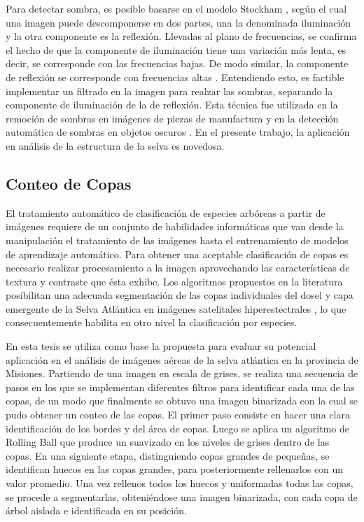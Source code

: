 Para detectar sombra, es posible basarse en el modelo Stockham \cite{stockham_image_1972}, según el cual una imagen puede descomponerse en dos partes, una la denominada iluminación y la otra componente es la reflexión. Llevadas al plano de frecuencias, se confirma el hecho de que la componente de iluminación tiene una variación más lenta, es decir, se corresponde con las frecuencias bajas. De modo similar, la componente de reflexión se corresponde con frecuencias altas \cite{oppenheim_nonlinear_1968}. Entendiendo esto, es factible implementar un filtrado en la imagen para realzar las sombras, separando la componente de iluminación de la de reflexión. Esta técnica fue utilizada en la remoción de sombras en imágenes de piezas de manufactura \cite{yang_research_2012} y en la detección automática de sombras en objetos oscuros \cite{etemadnia_automatic_2003}. En el presente trabajo, la aplicación en análisis de la estructura de la selva es novedosa.


\subsection{Conteo de Copas}
El tratamiento automático de clasificación de especies arbóreas a partir de imágenes requiere de un conjunto de habilidades informáticas que van desde la manipulación el tratamiento de las imágenes hasta el entrenamiento de modelos de aprendizaje automático. Para obtener una aceptable clasificación de copas es necesario realizar procesamiento a la imagen aprovechando las características de textura y contraste que ésta exhibe. Los algoritmos propuestos en la literatura posibilitan una adecuada segmentación de las copas individuales del dosel y capa emergente de la Selva Atlántica en imágenes satelitales hiperestectrales \cite{ferreira_tree_2019}, lo que consecuentemente habilita en otro nivel la clasificación por especies. 

En esta tesis se utiliza como base la propuesta \cite{ferreira_tree_2019} para evaluar su potencial aplicación en el análisis de imágenes aéreas de la selva atlántica en la provincia de Misiones.
Partiendo de una imagen en escala de grises, se realiza una secuencia de pasos en los que se implementan diferentes filtros para identificar cada una de las copas, de un modo que finalmente se obtuvo una imagen binarizada con la cual se pudo obtener un conteo de las copas. El primer paso consiste en hacer una clara identificación de los bordes y del área de copas. Luego se aplica un algoritmo de Rolling Ball \cite{sternberg_biomedical_1983} que produce un suavizado en los niveles de grises dentro de las copas. En una siguiente etapa, distinguiendo copas grandes de pequeñas, se identifican huecos en las copas grandes, para posteriormente rellenarlos con un valor promedio. Una vez rellenos todos los huecos y uniformadas todas las copas, se procede a segmentarlas, obteniéndose una imagen binarizada, con cada copa de árbol aislada e identificada en su posición.

